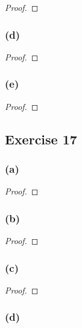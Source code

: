 \documentclass[14pt]{extarticle}
\begin{document}
\begin{proof}

\end{proof}

\subsubsection{(d)}

\begin{proof}

\end{proof}

\subsubsection{(e)}

\begin{proof}

\end{proof}

\subsection{Exercise 17}

\subsubsection{(a)}

\begin{proof}

\end{proof}

\subsubsection{(b)}

\begin{proof}

\end{proof}

\subsubsection{(c)}

\begin{proof}

\end{proof}

\subsubsection{(d)}
\end{document}
